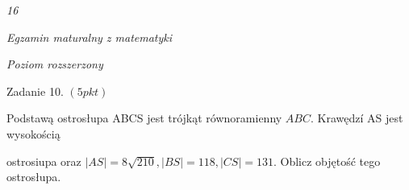 \documentclass[a4paper,12pt]{article}
\begin{document}
{\it 16}

{\it Egzamin maturalny z matematyki}

{\it Poziom rozszerzony}

Zadanie 10. $(5pkt)$

Podstawą ostrosłupa ABCS jest trójkąt równoramienny $ABC$. Krawędzí AS jest wysokością

ostrosiupa oraz $|AS|=8\sqrt{210}, |BS|=118, |CS|=131$. Oblicz objętość tego ostrosłupa.
\end{document}

